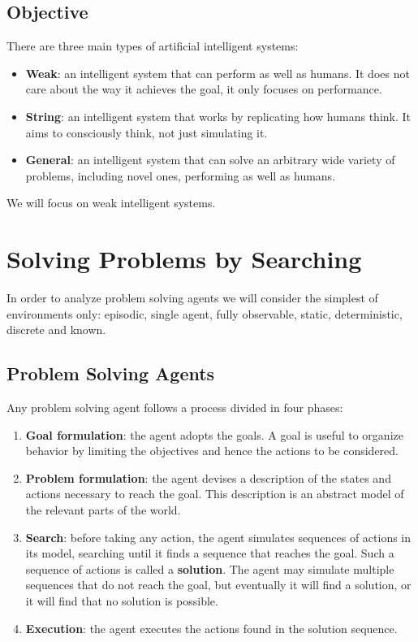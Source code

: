 \documentclass{article}
\begin{document}
\subsection{Objective}
There are three main types of artificial intelligent systems:
\begin{itemize}
    \item \textbf{Weak}: an intelligent system that can perform as well as humans. It does not care about the way it achieves the goal, it only focuses on performance.
    \item \textbf{String}: an intelligent system that works by replicating how humans think. It aims to consciously think, not just simulating it.
    \item \textbf{General}: an intelligent system that can solve an arbitrary wide variety of problems, including novel ones, performing as well as humans. 
\end{itemize}
We will focus on weak intelligent systems.

\clearpage
\section{Solving Problems by Searching}
In order to analyze problem solving agents we will consider the simplest of environments only: episodic, single agent, fully observable, static, deterministic, discrete and known.

\subsection{Problem Solving Agents}
Any problem solving agent follows a process divided in four phases:
\begin{enumerate}
    \item \textbf{Goal formulation}: the agent adopts the goals. A goal is useful to organize behavior by limiting the objectives and hence the actions to be considered.
    \item \textbf{Problem formulation}: the agent devises a description of the states and actions necessary to reach the goal. This description is an abstract model of the relevant parts of the world.
    \item \textbf{Search}: before taking any action, the agent simulates sequences of actions in its model, searching until it finds a sequence that reaches the goal. Such a sequence of actions is called a \textbf{solution}. The agent may simulate multiple sequences that do not reach the goal, but eventually it will find a solution, or it will find that no solution is possible.
    \item \textbf{Execution}: the agent executes the actions found in the solution sequence.
\end{enumerate}
\end{document}
